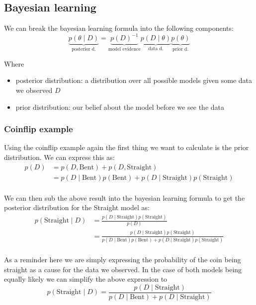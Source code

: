 \documentclass[12pt]{article}
\begin{document}
\subsection{Bayesian learning}

We can break the bayesian learning formula into the following components: 
\[
    \underbrace{p(\theta\mid D)}_{\text{posterior d.}} = \underbrace{p(D)^{-1}}_{\text{model evidence}} \underbrace{p(D\mid \theta)}_{\text{data d.}} \underbrace{p(\theta)}_{\text{prior d.}}
\]

Where 
\begin{itemize}[leftmargin=*, noitemsep]
    \item posterior distribution: a distribution over all possible models given some data we observed $D$
    \item prior distribution: our belief about the model before we see the data 
\end{itemize}

\subsubsection*{Coinflip example}

Using the coinflip example again the first thing we want to calculate is the prior distribution. We can express this as: 
\begin{align*}
    p(D) & = p(D, \text{Bent}) + p(D, \text{Straight}) \\
    & = p(D\mid \text{Bent})p(\text{Bent}) + p(D\mid \text{Straight})p(\text{Straight}) \\
\end{align*}

We can then sub the above result into the bayesian learning formula to get the posterior distribution for the Straight model as:
\begin{align*}
    p(\text{Straight}\mid D) & = \frac{p(D\mid \text{Straight})p(\text{Straight})}{p(D)} \\
    & = \frac{p(D\mid \text{Straight})p(\text{Straight})}{p(D\mid \text{Bent})p(\text{Bent}) + p(D\mid \text{Straight})p(\text{Straight})} \\
\end{align*}

As a reminder here we are simply expressing the probability of the coin being straight as a cause for the data we observed. In the case of both models being equally likely we can simplify the above expression to
\[
    p(\text{Straight}\mid D) = \frac{p(D\mid \text{Straight})}{p(D\mid \text{Bent}) + p(D\mid \text{Straight})}  
\]
\end{document}
